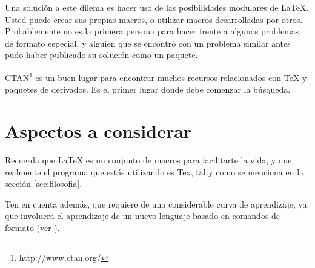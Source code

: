\documentclass[letterpaper,11pt]{article}
\begin{document}
Una solución a este dilema es hacer uso de las posibilidades modulares de LaTeX. Usted puede crear sus propias macros, o utilizar macros desarrolladas por otros. Probablemente no es la primera persona para hacer frente a algunos problemas de formato especial, y alguien que se encontró con un problema similar antes pudo haber publicado su solución como un paquete.

CTAN\footnote{http://www.ctan.org/} es un buen lugar para encontrar muchos recursos relacionados con TeX y paquetes de derivados. Es el primer lugar donde debe comenzar la búsqueda.

\section{Aspectos a considerar}

Recuerda que LaTeX es un conjunto de macros para facilitarte la vida, y que realmente el programa que estás utilizando es Tex, tal y como se menciona en la sección \ref{sec:filosofia}.

Ten en cuenta además, que requiere de una considerable curva de aprendizaje, ya que involucra el aprendizaje de un nuevo lenguaje basado en comandos de formato (ver ).
\end{document}
